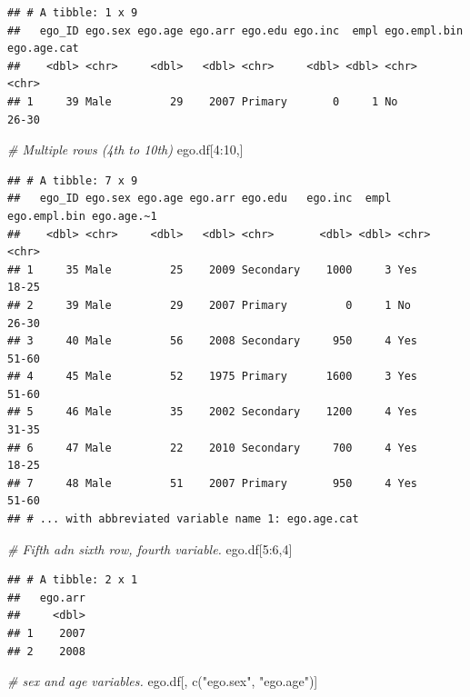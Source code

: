 \documentclass[
]{book}
\newenvironment{Shaded}{\begin{snugshade}}{\end{snugshade}}
\newcommand{\CommentTok}[1]{\textcolor[rgb]{0.56,0.35,0.01}{\textit{#1}}}
\newcommand{\DecValTok}[1]{\textcolor[rgb]{0.00,0.00,0.81}{#1}}
\newcommand{\FunctionTok}[1]{\textcolor[rgb]{0.00,0.00,0.00}{#1}}
\newcommand{\NormalTok}[1]{#1}
\newcommand{\SpecialCharTok}[1]{\textcolor[rgb]{0.00,0.00,0.00}{#1}}
\newcommand{\StringTok}[1]{\textcolor[rgb]{0.31,0.60,0.02}{#1}}
\begin{document}
\begin{verbatim}
## # A tibble: 1 x 9
##   ego_ID ego.sex ego.age ego.arr ego.edu ego.inc  empl ego.empl.bin ego.age.cat
##    <dbl> <chr>     <dbl>   <dbl> <chr>     <dbl> <dbl> <chr>        <chr>      
## 1     39 Male         29    2007 Primary       0     1 No           26-30
\end{verbatim}

\begin{Shaded}
\begin{Highlighting}[]
\CommentTok{\# Multiple rows (4th to 10th)}
\NormalTok{ego.df[}\DecValTok{4}\SpecialCharTok{:}\DecValTok{10}\NormalTok{,]}
\end{Highlighting}
\end{Shaded}

\begin{verbatim}
## # A tibble: 7 x 9
##   ego_ID ego.sex ego.age ego.arr ego.edu   ego.inc  empl ego.empl.bin ego.age.~1
##    <dbl> <chr>     <dbl>   <dbl> <chr>       <dbl> <dbl> <chr>        <chr>     
## 1     35 Male         25    2009 Secondary    1000     3 Yes          18-25     
## 2     39 Male         29    2007 Primary         0     1 No           26-30     
## 3     40 Male         56    2008 Secondary     950     4 Yes          51-60     
## 4     45 Male         52    1975 Primary      1600     3 Yes          51-60     
## 5     46 Male         35    2002 Secondary    1200     4 Yes          31-35     
## 6     47 Male         22    2010 Secondary     700     4 Yes          18-25     
## 7     48 Male         51    2007 Primary       950     4 Yes          51-60     
## # ... with abbreviated variable name 1: ego.age.cat
\end{verbatim}

\begin{Shaded}
\begin{Highlighting}[]
\CommentTok{\# Fifth adn sixth row, fourth variable.}
\NormalTok{ego.df[}\DecValTok{5}\SpecialCharTok{:}\DecValTok{6}\NormalTok{,}\DecValTok{4}\NormalTok{]}
\end{Highlighting}
\end{Shaded}

\begin{verbatim}
## # A tibble: 2 x 1
##   ego.arr
##     <dbl>
## 1    2007
## 2    2008
\end{verbatim}

\begin{Shaded}
\begin{Highlighting}[]
\CommentTok{\# sex and age variables.}
\NormalTok{ego.df[, }\FunctionTok{c}\NormalTok{(}\StringTok{"ego.sex"}\NormalTok{, }\StringTok{"ego.age"}\NormalTok{)]}
\end{Highlighting}
\end{Shaded}
\end{document}
